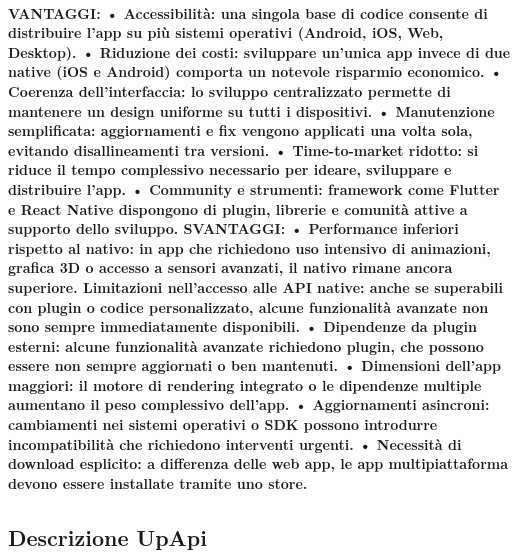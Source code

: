 \paragraph{VANTAGGI:
•  Accessibilità: una singola base di codice consente di distribuire l'app su più sistemi operativi (Android, iOS, Web, Desktop).
•  Riduzione dei costi: sviluppare un’unica app invece di due native (iOS e Android) comporta un notevole risparmio economico.
•  Coerenza dell’interfaccia: lo sviluppo centralizzato permette di mantenere un design uniforme su tutti i dispositivi.
•  Manutenzione semplificata: aggiornamenti e fix vengono applicati una volta sola, evitando disallineamenti tra versioni.
•  Time-to-market ridotto: si riduce il tempo complessivo necessario per ideare, sviluppare e distribuire l’app.
•  Community e strumenti: framework come Flutter e React Native dispongono di plugin, librerie e comunità attive a supporto dello sviluppo.
SVANTAGGI:
•  Performance inferiori rispetto al nativo: in app che richiedono uso intensivo di animazioni, grafica 3D o accesso a sensori avanzati, il nativo rimane ancora superiore.
Limitazioni nell’accesso alle API native: anche se superabili con plugin o codice personalizzato, alcune funzionalità avanzate non sono sempre immediatamente disponibili.
•  Dipendenze da plugin esterni: alcune funzionalità avanzate richiedono plugin, che possono essere non sempre aggiornati o ben mantenuti.
•  Dimensioni dell'app maggiori: il motore di rendering integrato o le dipendenze multiple aumentano il peso complessivo dell’app.
•  Aggiornamenti asincroni: cambiamenti nei sistemi operativi o SDK possono introdurre incompatibilità che richiedono interventi urgenti.
•  Necessità di download esplicito: a differenza delle web app, le app multipiattaforma devono essere installate tramite uno store.
}

\subsection{Descrizione UpApi}

